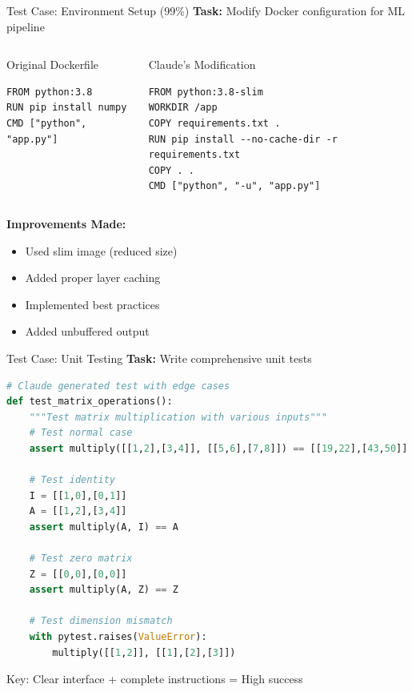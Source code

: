 \documentclass[aspectratio=169]{beamer}
\begin{document}
\begin{frame}[fragile]{Test Case: Environment Setup (99\%)}
	\textbf{Task:} Modify Docker configuration for ML pipeline
	
	\begin{columns}
		\begin{block}{Original Dockerfile}
			\footnotesize
			\begin{lstlisting}[basicstyle=\tiny]
FROM python:3.8
RUN pip install numpy
CMD ["python", "app.py"]
			\end{lstlisting}
		\end{block}
		
		\begin{block}{Claude's Modification}
			\footnotesize
			\begin{lstlisting}[basicstyle=\tiny]
FROM python:3.8-slim
WORKDIR /app
COPY requirements.txt .
RUN pip install --no-cache-dir -r requirements.txt
COPY . .
CMD ["python", "-u", "app.py"]
			\end{lstlisting}
		\end{block}
	\end{columns}
	
	\textbf{Improvements Made:}
	\begin{itemize}
		\item Used slim image (reduced size)
		\item Added proper layer caching
		\item Implemented best practices
		\item Added unbuffered output
	\end{itemize}
\end{frame}

\begin{frame}[fragile]{Test Case: Unit Testing}
	\textbf{Task:} Write comprehensive unit tests
	
	\begin{lstlisting}[language=python, basicstyle=\tiny]
# Claude generated test with edge cases
def test_matrix_operations():
    """Test matrix multiplication with various inputs"""
    # Test normal case
    assert multiply([[1,2],[3,4]], [[5,6],[7,8]]) == [[19,22],[43,50]]
    
    # Test identity
    I = [[1,0],[0,1]]
    A = [[1,2],[3,4]]
    assert multiply(A, I) == A
    
    # Test zero matrix
    Z = [[0,0],[0,0]]
    assert multiply(A, Z) == Z
    
    # Test dimension mismatch
    with pytest.raises(ValueError):
        multiply([[1,2]], [[1],[2],[3]])
	\end{lstlisting}
	
	{\color{highlight}Key: Clear interface + complete instructions = High success}
\end{frame}
\end{document}

